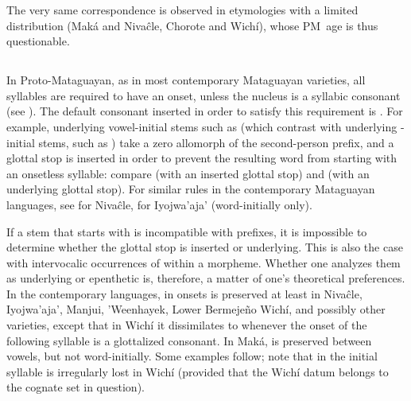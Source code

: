\begin{exe}
    \ex \food
    \ex \elbow
    \ex \welln
    \ex \snore \label{q-snore}
    \ex \inorderto
    \ex \alienable
    \ex \distrust
    \ex \leg
    \ex \starn
    \ex \fishwithhook
    \ex \gutscw
    \ex \costume
    \ex \wildcat
    \ex \chaja
    \ex \wildhoney
    \ex \knee
\end{exe}

The very same correspondence is observed in etymologies with a limited distribution (Maká and Nivaĉle, Chorote and Wichí), whose PM~age is thus questionable.

\begin{exe}
    \ex \dwarf
    \ex \medicine
    \ex \standv
    \ex \limpkin
    \ex \belt
    \ex \yellowv
    \ex \noden
    \ex \cardon
    \ex \tsaqaq
    \ex \paralytic
    \ex \cord
\end{exe}

\subsection{}\label{proto-glottal}

In Proto-Mataguayan, as in most contemporary Mataguayan varieties, all syllables are required to have an onset, unless the nucleus is a syllabic consonant (see ). The default consonant inserted in order to satisfy this requirement is . For example, underlying vowel-initial stems such as  (which contrast with underlying \mbox{-}initial stems, such as ) take a zero allomorph of the second-person prefix, and a glottal stop is inserted in order to prevent the resulting word from starting with an onsetless syllable: compare  (with an inserted glottal stop) and  (with an underlying glottal stop). For similar rules in the contemporary Mataguayan languages, see \citet[43, 67, 102--105]{AnG15} for Nivaĉle, \citet[90]{JC14b} for Iyojwa’aja’ (word-initially only).

If a stem that starts with  is incompatible with prefixes, it is impossible to determine whether the glottal stop is inserted or underlying. This is also the case with intervocalic occurrences of  within a morpheme. Whether one analyzes them as underlying or epenthetic is, therefore, a matter of one's theoretical preferences. In the contemporary languages,  in onsets is preserved at least in Nivaĉle, Iyojwa’aja’, Manjui, ’Weenhayek, Lower Bermejeño Wichí, and possibly other varieties, except that in Wichí it dissimilates to  whenever the onset of the following syllable is a glottalized consonant. In Maká,  is preserved between vowels, but not word-initially. Some examples follow; note that in  the initial syllable is irregularly lost in Wichí (provided that the Wichí datum belongs to the cognate set in question).

